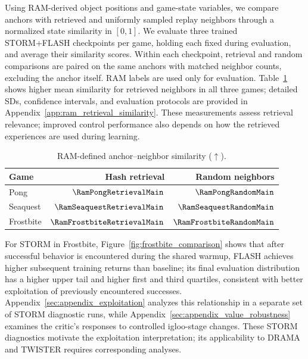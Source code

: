 \documentclass{article} %
\begin{document}
Using RAM-derived object positions and game-state variables, we compare anchors with retrieved and uniformly sampled replay neighbors through a normalized state similarity in $[0,1]$. We evaluate three trained STORM+FLASH checkpoints per game, holding each fixed during evaluation, and average their similarity scores. Within each checkpoint, retrieval and random comparisons are paired on the same anchors with matched neighbor counts, excluding the anchor itself. RAM labels are used only for evaluation. Table~\ref{tab:ram_retrieval_main} shows higher mean similarity for retrieved neighbors in all three games; detailed SDs, confidence intervals, and evaluation protocols are provided in Appendix~\ref{app:ram_retrieval_similarity}. These measurements assess retrieval relevance; improved control performance also depends on how the retrieved experiences are used during learning.

\begin{table}[!htbp]
\centering
\small
\caption{RAM-defined anchor--neighbor similarity ($\uparrow$).}
\label{tab:ram_retrieval_main}
\begin{tabular}{lrr}
\toprule
Game & Hash retrieval & Random neighbors \\
\midrule
Pong & $\RamPongRetrievalMain$ & $\RamPongRandomMain$ \\
Seaquest & $\RamSeaquestRetrievalMain$ & $\RamSeaquestRandomMain$ \\
Frostbite & $\RamFrostbiteRetrievalMain$ & $\RamFrostbiteRandomMain$ \\
\bottomrule
\end{tabular}
\end{table}

For STORM in Frostbite, Figure~\ref{fig:frostbite_comparison} shows that after successful behavior is encountered during the shared warmup, FLASH achieves higher subsequent training returns than baseline; its final evaluation distribution has a higher upper tail and higher first and third quartiles, consistent with better exploitation of previously encountered successes. Appendix~\ref{sec:appendix_exploitation} analyzes this relationship in a separate set of STORM diagnostic runs, while Appendix~\ref{sec:appendix_value_robustness} examines the critic's responses to controlled igloo-stage changes. These STORM diagnostics motivate the exploitation interpretation; its applicability to DRAMA and TWISTER requires corresponding analyses.
\end{document}
